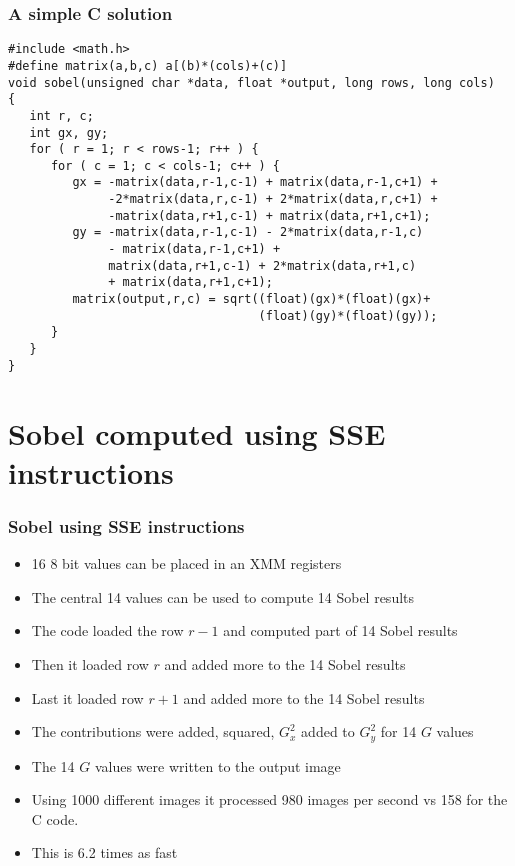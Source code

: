 \documentclass{beamer}
\begin{document}
\begin{frame}[fragile]
    \frametitle{A simple C solution}
\small
\begin{verbatim}
#include <math.h>
#define matrix(a,b,c) a[(b)*(cols)+(c)]
void sobel(unsigned char *data, float *output, long rows, long cols)
{
   int r, c;
   int gx, gy;
   for ( r = 1; r < rows-1; r++ ) {
      for ( c = 1; c < cols-1; c++ ) {
         gx = -matrix(data,r-1,c-1) + matrix(data,r-1,c+1) +
              -2*matrix(data,r,c-1) + 2*matrix(data,r,c+1) +
              -matrix(data,r+1,c-1) + matrix(data,r+1,c+1);
         gy = -matrix(data,r-1,c-1) - 2*matrix(data,r-1,c)
              - matrix(data,r-1,c+1) +
              matrix(data,r+1,c-1) + 2*matrix(data,r+1,c)
              + matrix(data,r+1,c+1);
         matrix(output,r,c) = sqrt((float)(gx)*(float)(gx)+
                                   (float)(gy)*(float)(gy));
      }
   }
}
\end{verbatim}
\end{frame}

\section{Sobel computed using SSE instructions}

\begin{frame}[fragile]
    \frametitle{Sobel using SSE instructions}
    \begin{itemize}
        \item 16 8 bit values can be placed in an XMM registers
        \item The central 14 values can be used to compute 14 Sobel results
        \item The code loaded the row $r-1$ and computed part of 14 Sobel results
        \item Then it loaded row $r$ and added more to the 14 Sobel results
        \item Last it loaded row $r+1$ and added more to the 14 Sobel results
        \item The contributions were added, squared, $G_x^2$ added to $G_y^2$ for
              14 $G$ values
        \item The 14 $G$ values were written to the output image
        \item Using 1000 different images it processed 980 images per second
              vs 158 for the C code.
        \item This is 6.2 times as fast
    \end{itemize}
\end{frame}
\end{document}
